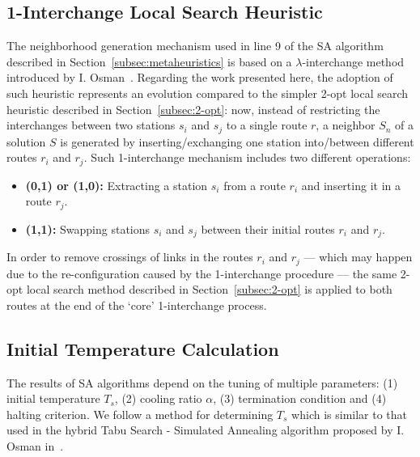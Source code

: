 \subsection{1-Interchange Local Search Heuristic}
\label{subsec:1-ichange}

The neighborhood generation mechanism used in line 9 of the SA algorithm 
described in Section~\ref{subsec:metaheuristics} is based on 
a $\lambda$-interchange method introduced by 
I. Osman~\cite{Osman1993,Thangiahl1996,Toth2002}. Regarding the work presented 
here, the 
adoption of such heuristic represents an evolution compared to the 
simpler 2-opt local search heuristic described in Section~\ref{subsec:2-opt}: 
now, instead of restricting the interchanges between two stations $s_i$ and 
$s_j$ to a single route $r$, a neighbor $S_n$ of a solution $S$ is 
generated by inserting\slash exchanging one station into\slash between 
different routes $r_i$ and $r_j$. Such 1-interchange mechanism includes two 
different operations:

\begin{itemize}

    \item \textbf{(0,1) or (1,0):} Extracting a station $s_i$ from a route 
        $r_i$ and inserting it in a route $r_j$.
    \item \textbf{(1,1):} Swapping stations $s_i$ and $s_j$ between their 
        initial routes $r_i$ and $r_j$.

\end{itemize}\vertbreak

In order to remove crossings of links in the routes $r_i$ and $r_j$ --- which 
may happen due to the re-configuration caused by the 1-interchange 
procedure --- the same 2-opt local search method described in 
Section~\ref{subsec:2-opt} is applied to both routes at the end of the `core' 
1-interchange process.\vertbreak

\subsection{Initial Temperature Calculation}
\label{subsec:cooling}

The results of SA algorithms depend on the tuning of multiple parameters: (1) 
initial temperature $T_s$, (2) cooling ratio $\alpha$, (3) termination 
condition and (4) halting criterion. We follow a method for determining $T_s$ 
which is similar to that used in the hybrid Tabu Search - Simulated 
Annealing algorithm proposed by I. Osman in~\cite{Osman1993}.\vertbreak

